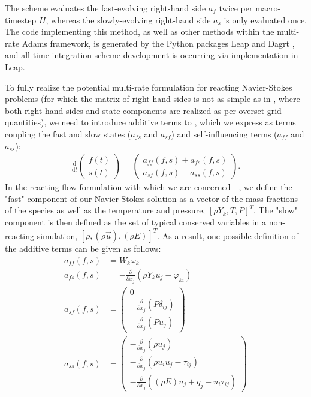 The scheme evaluates the fast-evolving right-hand side $a_{f}$ twice per
macro-timestep $H$, whereas the slowly-evolving right-hand side $a_{s}$ is only
evaluated once. The code implementing this method, as well as other methods
within the multi-rate Adams framework, is generated by the Python packages 
Leap \cite{Leap2020} and Dagrt \cite{Dagrt2020}, and all time integration scheme
development is occurring via implementation in Leap.

To fully realize the potential multi-rate formulation for reacting
Navier-Stokes problems (for which the matrix of right-hand sides is
not as simple as in \cite{mikida2019multi}, where both right-hand sides
and state components are realized as per-overset-grid quantities),
we need to introduce additive terms to , which we express
as terms coupling the fast and slow states ($a_{fs}$ and $a_{sf}$) and
self-influencing terms ($a_{ff}$ and $a_{ss}$):
\begin{align}
\frac{\textrm{d}}{\textrm{d}t}\left( \begin{array}{c} f(t) \\ s(t) \end{array} \right) = \left( \begin{array}{c} a_{ff}(f,s) + a_{fs}(f,s) \\ a_{sf}(f,s) + a_{ss}(f,s) \end{array} \right). \label{eq:mr_reacting}
\end{align}
In the reacting flow formulation with which we are concerned  - , we define
the "fast" component of our Navier-Stokes solution as a vector of the
mass fractions of the species as well as the temperature and pressure, $[\rho Y_{k}, T, P]^T$.
The "slow" component is then defined as the set of typical conserved variables in a
non-reacting simulation, $[\rho, (\rho \vec{u}), (\rho E)]^T$. As
a result, one possible definition of the additive terms  can be given as follows:
\begin{align}
a_{ff}(f,s) &= W_{k}\dot{\omega}_{k} \\
a_{fs}(f,s) &= -\frac{\partial}{\partial x_{j}}(\rho Y_{k} u_{j} - \varphi_{ki}) \\
a_{sf}(f,s) &= \left(\begin{array}{c} 0 \\
                                      -\frac{\partial}{\partial x_{j}}(P\delta_{ij}) \\
                                      -\frac{\partial}{\partial x_{j}}(Pu_{j}) \end{array} \right) \\
a_{ss}(f,s) &= \left(\begin{array}{c} -\frac{\partial}{\partial x_{j}}(\rho u_{j}) \\
                                      -\frac{\partial}{\partial x_{j}}(\rho u_{i} u_{j} - \tau_{ij}) \\
                                      -\frac{\partial}{\partial x_{j}}((\rho E)u_{j} + q_{j} - u_{i}\tau_{ij}) \end{array} \right)
\end{align}
